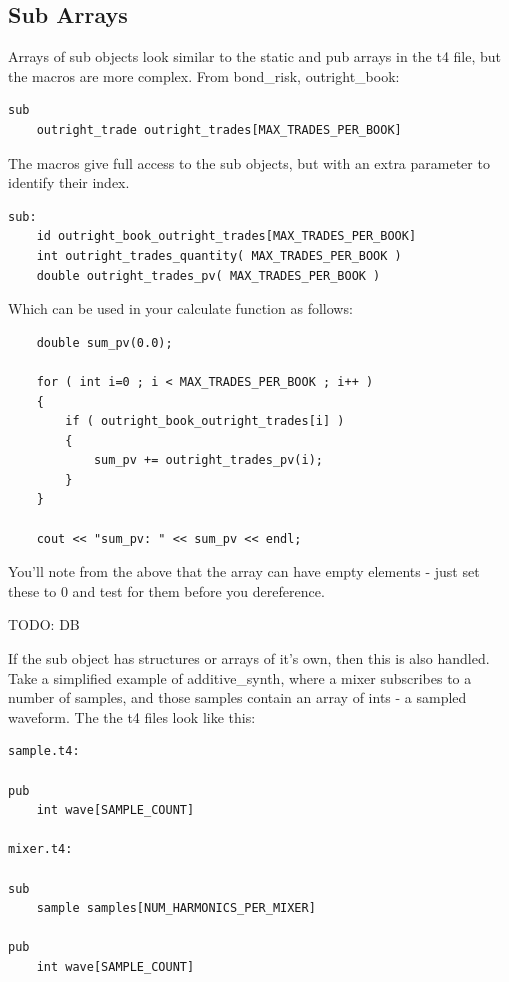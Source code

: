 \documentclass{report}
\begin{document}
\subsection{Sub Arrays}

Arrays of sub objects look similar to the static and pub arrays in the t4 file, but the macros are more complex. From bond_risk, outright_book:

\begin{verbatim}
sub
    outright_trade outright_trades[MAX_TRADES_PER_BOOK]
\end{verbatim}

The macros give full access to the sub objects, but with an extra parameter to identify their index.

\begin{verbatim}
sub:
    id outright_book_outright_trades[MAX_TRADES_PER_BOOK]
    int outright_trades_quantity( MAX_TRADES_PER_BOOK )
    double outright_trades_pv( MAX_TRADES_PER_BOOK )
\end{verbatim}

Which can be used in your calculate function as follows:

\begin{verbatim}
    double sum_pv(0.0);
    
    for ( int i=0 ; i < MAX_TRADES_PER_BOOK ; i++ )
    {
        if ( outright_book_outright_trades[i] )
        {
            sum_pv += outright_trades_pv(i);
        }
    }

    cout << "sum_pv: " << sum_pv << endl;
\end{verbatim}

You'll note from the above that the array can have empty elements - just set these to 0 and test for them before you dereference.

TODO: DB

If the sub object has structures or arrays of it's own, then this is also handled. Take a simplified example of additive_synth, where a mixer subscribes to a number of samples, and those samples contain an array of ints - a sampled waveform. The the t4 files look like this:


\begin{verbatim}
sample.t4:

pub
    int wave[SAMPLE_COUNT]

mixer.t4:

sub
    sample samples[NUM_HARMONICS_PER_MIXER]

pub
    int wave[SAMPLE_COUNT]
\end{verbatim}
\end{document}
